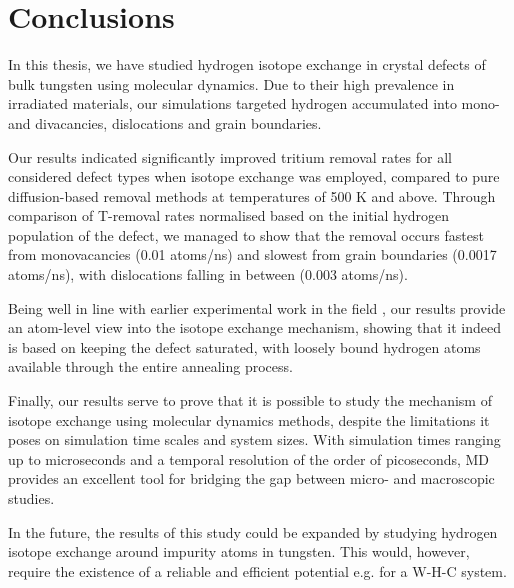 \chapter{Conclusions}

In this thesis, we have studied hydrogen isotope exchange in crystal defects of bulk tungsten using molecular dynamics. 
Due to their high prevalence in irradiated materials, our simulations targeted hydrogen accumulated into mono- and divacancies, dislocations and grain boundaries.  

Our results indicated significantly improved tritium removal rates for all considered defect types when isotope exchange was employed, compared to pure diffusion-based removal methods at temperatures of 500 K and above.
Through comparison of T-removal rates normalised based on the initial hydrogen population of the defect, we managed to show that the removal occurs fastest from monovacancies (0.01 atoms/ns) and slowest from grain boundaries (0.0017 atoms/ns), with dislocations falling in between (0.003 atoms/ns).

Being well in line with earlier experimental work in the field \cite{ahlgren2019hydrogen}, our results provide an atom-level view into the isotope exchange mechanism, showing that it indeed is based on keeping the defect saturated, with loosely bound hydrogen atoms available through the entire annealing process.

Finally, our results serve to prove that it is possible to study the mechanism of isotope exchange using molecular dynamics methods, despite the limitations it poses on simulation time scales and system sizes.
With simulation times ranging up to microseconds and a temporal resolution of the order of picoseconds, MD provides an excellent tool for bridging the gap between micro- and macroscopic studies.

In the future, the results of this study could be expanded by studying hydrogen isotope exchange around impurity atoms in tungsten.
This would, however, require the existence of a reliable and efficient potential e.g. for a W-H-C system.   
